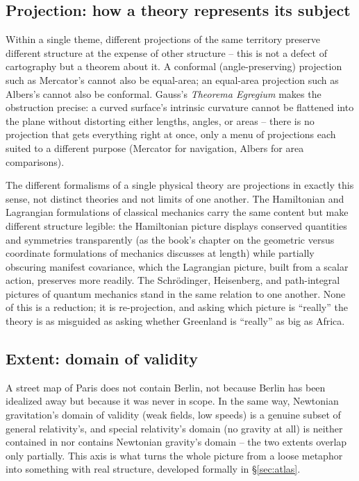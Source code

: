 \subsection{Projection: how a theory represents its subject}

Within a single theme, different projections of the same territory preserve different structure at the expense of other structure -- this is not a defect of cartography but a theorem about it. A conformal (angle-preserving) projection such as Mercator's cannot also be equal-area; an equal-area projection such as Albers's cannot also be conformal. Gauss's \emph{Theorema Egregium} makes the obstruction precise: a curved surface's intrinsic curvature cannot be flattened into the plane without distorting either lengths, angles, or areas -- there is no projection that gets everything right at once, only a menu of projections each suited to a different purpose (Mercator for navigation, Albers for area comparisons).

The different formalisms of a single physical theory are projections in exactly this sense, not distinct theories and not limits of one another. The Hamiltonian and Lagrangian formulations of classical mechanics carry the same content but make different structure legible: the Hamiltonian picture displays conserved quantities and symmetries transparently (as the book's chapter on the geometric versus coordinate formulations of mechanics discusses at length) while partially obscuring manifest covariance, which the Lagrangian picture, built from a scalar action, preserves more readily. The Schr\"odinger, Heisenberg, and path-integral pictures of quantum mechanics stand in the same relation to one another. None of this is a reduction; it is re-projection, and asking which picture is ``really'' the theory is as misguided as asking whether Greenland is ``really'' as big as Africa.

\subsection{Extent: domain of validity}

A street map of Paris does not contain Berlin, not because Berlin has been idealized away but because it was never in scope. In the same way, Newtonian gravitation's domain of validity (weak fields, low speeds) is a genuine subset of general relativity's, and special relativity's domain (no gravity at all) is neither contained in nor contains Newtonian gravity's domain -- the two extents overlap only partially. This axis is what turns the whole picture from a loose metaphor into something with real structure, developed formally in \S\ref{sec:atlas}.

